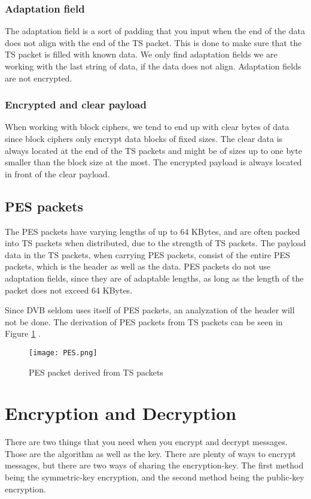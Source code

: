 \subsubsection{Adaptation field}
The adaptation field is a sort of padding that you input when the end of the 
data does not align with the end of the TS packet. This is done to make sure 
that the TS packet is filled with known data. We only find adaptation fields we 
are working with the last string of data, if the data does not align. Adaptation 
fields are not encrypted. \cite[pp. 10--11]{DVB:2013}

\subsubsection{Encrypted and clear payload}
When working with block ciphers, we tend to end up with clear bytes of data 
since block ciphers only encrypt data blocks of fixed sizes. The clear data 
is always located at the end of the TS packets and might be of sizes up to one 
byte smaller than the block size at the most. The encrypted payload is always 
located in front of the clear payload. \cite[pp. 10--11]{DVB:2013}

\subsection{PES packets}
The PES packets have varying lengths of up to 64 KBytes, and are often packed 
into TS packets when distributed, due to the strength of TS packets. The payload 
data in the TS packets, when carrying PES packets, consist of the entire PES 
packets, which is the header as well as the data. PES packets do not use 
adaptation fields, since they are of adaptable lengths, as long as the length of 
the packet does not exceed 64 KBytes.

Since DVB seldom uses itself of PES packets, an analyzation of the header will 
not be done. The derivation of PES packets from TS packets can be seen in Figure \ref{img:PES} \citep[p. 9]{ETR:289}.


\begin{figure}
  \texttt{[image: PES.png]}
  \caption{PES packet derived from TS packets}
  \label{img:PES}
\end{figure}

\section{Encryption and Decryption}
There are two things that you need when you encrypt and decrypt messages. Those 
are the algorithm as well as the key. There are plenty of ways to encrypt 
messages, but there are two ways of sharing the encryption-key. The first method 
being the symmetric-key encryption, and the second method being the public-key 
encryption.

